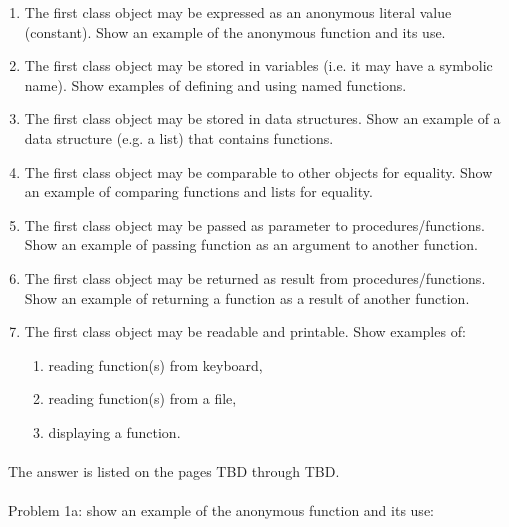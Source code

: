 \documentclass{article}
\begin{document}
		\begin{enumerate}[label=\alph*)]
		
			\item The first class object may be expressed as an anonymous literal value (constant). Show an example of the anonymous function and its use.
			
			\item The first class object may be stored in variables (i.e. it may have a symbolic name). Show examples of defining and using named functions.
			
			\item The first class object may be stored in data structures. Show an example of a data structure (e.g. a list) that contains functions.
			
			\item The first class object may be comparable to other objects for equality. Show an example of comparing functions and lists for equality.
			
			\item The first class object may be passed as parameter to procedures/functions. Show an example of passing function as an argument to another function.
			
			\item The first class object may be returned as result from procedures/functions. Show an example of returning a function as a result of another function.
			
			\item The first class object may be readable and printable. Show examples of:
				\begin{enumerate}[label=-]
				
					\item reading function(s) from keyboard,
					
					\item reading function(s) from a file,
					
					\item displaying a function.
					
				\end{enumerate}
			
		\end{enumerate}
		
\paragraph{}\
		The answer is listed on the pages TBD through TBD.
\paragraph{}\
Problem 1a: show an example of the anonymous function and its use:
\end{document}
